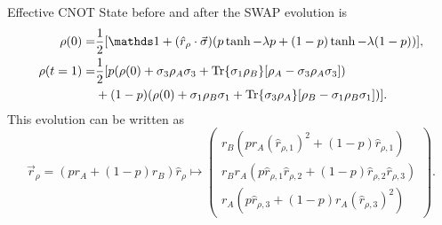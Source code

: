 \begin{frame}{Effective CNOT}
    State before and after the SWAP evolution is
    \begin{align*}
        \rho(0)=&\frac{1}{2}[\Id+(\hat{r}_{\rho}\cdot\vec{\sigma})(p\tanh{-\lambda p}+(1-p)\tanh{-\lambda (1-p)})],\\
        \rho(t=1)=&\frac{1}{2}[p(\rho(0)+\sigma_{3}\rho_{A}\sigma_{3}+\Tr{\sigma_{1}\rho_{B}}[\rho_{A}-\sigma_{3}\rho_{A}\sigma_{3}])\\
    &+(1-p)(\rho(0)+\sigma_{1}\rho_{B}\sigma_{1}+\Tr{\sigma_{3}\rho_{A}}[\rho_{B}-\sigma_{1}\rho_{B}\sigma_{1}])].
        \end{align*}
      This evolution can be written as
      \begin{equation*}
        \vec{r}_{\rho}=(pr_{A}+(1-p)r_{B})\hat{r}_{\rho}\mapsto\begin{pmatrix}
            r_{B}(pr_{A}(\hat{r}_{\rho,1})^2+(1-p)\hat{r}_{\rho,1})\\
            r_{B}r_{A}(p\hat{r}_{\rho,1}\hat{r}_{\rho,2}+(1-p)\hat{r}_{\rho,2}\hat{r}_{\rho,3})\\
            r_{A}(p\hat{r}_{\rho,3}+(1-p)r_{A}(\hat{r}_{\rho,3})^{2})
        \end{pmatrix}.
      \end{equation*}
\end{frame}

